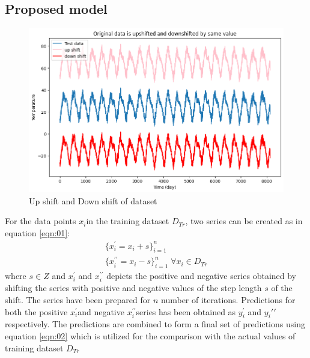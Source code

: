 \documentclass[sn-mathphys,Numbered]{sn-jnl}
\theoremstyle{thmstyleone}
\theoremstyle{thmstyletwo}
\theoremstyle{thmstylethree}
\begin{document}
\subsection{Proposed model}
\begin{figure}[ht!]
    \centering
    \includegraphics[width=1\textwidth, height=0.9\linewidth]{shifted_dataset.png}
    \caption{Up shift and Down shift of dataset}
    \label{fig:shifted_dataset}
\end{figure}
For the data points $x_i$in the training dataset $D_{Tr}$, two series can be created as in equation \ref{eqn:01}:
\begin{equation}
\begin{aligned}
\label{eqn:01}
\{x_i^{\prime}=x_i+s\}_{i=1}^n \\
\{x_i^{\prime\prime}=x_i-s\}_{i=1}^n \; \forall x_i \in D_{Tr}
\end{aligned}
\end{equation}
where $s \in Z$ and $x_i^{\prime}$ and $x_{i}^{\prime\prime}$ depicts the positive and negative series obtained by shifting the series with positive and negative values of the step length $s$ of the shift. The series have been prepared for $n$ number of iterations.
Predictions for both the positive $x_i^{\prime}$and negative $x_i^{\prime\prime}$series has been obtained as $y_i^{\prime}$ and $y_i{\prime\prime}$ respectively.
The predictions are combined to form a final set of predictions using equation \ref{eqn:02} which is utilized for the comparison with the actual values of training dataset $D_{Tr}$
\end{document}
